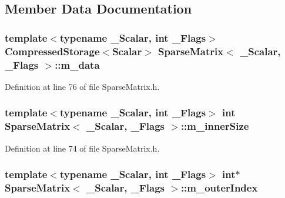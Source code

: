 \subsection{Member Data Documentation}
\hypertarget{class_sparse_matrix_a1097b14c8860e0a7f72aa90aab6a7896}{
\subsubsection[{m\-\_\-data}]{\setlength{\rightskip}{0pt plus 5cm}template$<$typename \-\_\-\-Scalar, int \-\_\-\-Flags$>$ {\bf Compressed\-Storage}$<${\bf Scalar}$>$ {\bf Sparse\-Matrix}$<$ \-\_\-\-Scalar, \-\_\-\-Flags $>$\-::m\-\_\-data\hspace{0.3cm}{\ttfamily [protected]}}}\label{class_sparse_matrix_a1097b14c8860e0a7f72aa90aab6a7896}


Definition at line 76 of file Sparse\-Matrix.\-h.

\hypertarget{class_sparse_matrix_a4480eac68546e6e51738c5f712a4e0c0}{
\subsubsection[{m\-\_\-inner\-Size}]{\setlength{\rightskip}{0pt plus 5cm}template$<$typename \-\_\-\-Scalar, int \-\_\-\-Flags$>$ {\bf int} {\bf Sparse\-Matrix}$<$ \-\_\-\-Scalar, \-\_\-\-Flags $>$\-::m\-\_\-inner\-Size\hspace{0.3cm}{\ttfamily [protected]}}}\label{class_sparse_matrix_a4480eac68546e6e51738c5f712a4e0c0}


Definition at line 74 of file Sparse\-Matrix.\-h.

\hypertarget{class_sparse_matrix_a6a2e46de0361a3b05f7641ece22632f4}{
\subsubsection[{m\-\_\-outer\-Index}]{\setlength{\rightskip}{0pt plus 5cm}template$<$typename \-\_\-\-Scalar, int \-\_\-\-Flags$>$ {\bf int}$\ast$ {\bf Sparse\-Matrix}$<$ \-\_\-\-Scalar, \-\_\-\-Flags $>$\-::m\-\_\-outer\-Index\hspace{0.3cm}{\ttfamily [protected]}}}\label{class_sparse_matrix_a6a2e46de0361a3b05f7641ece22632f4}


